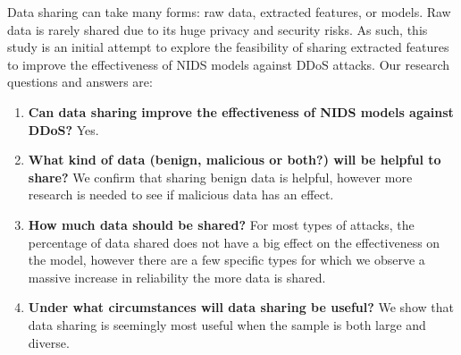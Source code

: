 \begin{intro}
Data sharing can take many forms: \eg raw data, extracted features, or models. Raw data is rarely shared due to its huge privacy and security risks. As such, this study is an initial attempt to explore the feasibility of sharing extracted features to improve the effectiveness of NIDS models against DDoS attacks. Our research questions and answers are:
\begin{enumerate}
    \item \textbf{Can data sharing improve the effectiveness of NIDS models against DDoS?} Yes.
    \item \textbf{What kind of data (benign, malicious or both?) will be helpful to share?} We confirm that sharing benign data is helpful, however more research is needed to see if malicious data has an effect.
    \item \textbf{How much data should be shared?} For most types of attacks, the percentage of data shared does not have a big effect on the effectiveness on the model, however there are a few specific types for which we observe a massive increase in reliability the more data is shared.
    \item \textbf{Under what circumstances will data sharing be useful?} We show that data sharing is seemingly most useful when the sample is both large and diverse.
    
\end{enumerate}








\end{intro}
